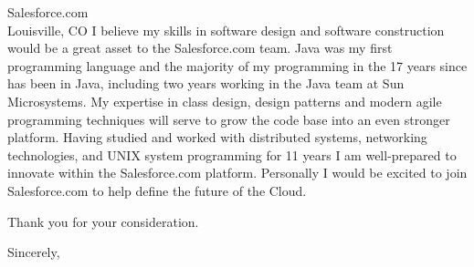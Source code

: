 \documentclass{letter}
\begin{document}
\begin{letter}{Salesforce.com\\Louisville, CO}
I believe my skills in software design and software construction
would be a great asset to the Salesforce.com team.  Java was my
first programming language and the majority of my programming in
the 17 years since has been in Java, including two years working
in the Java team at Sun Microsystems.  My expertise in class design,
design patterns and modern agile programming techniques will serve
to grow the code base into an even stronger platform.  Having studied
and worked with distributed systems, networking technologies, and
UNIX system programming for 11 years I am well-prepared to innovate
within the Salesforce.com platform.  Personally I would be excited
to join Salesforce.com to help define the future of the Cloud.

Thank you for your consideration.

\closing{Sincerely,}
\end{letter}
\end{document}

